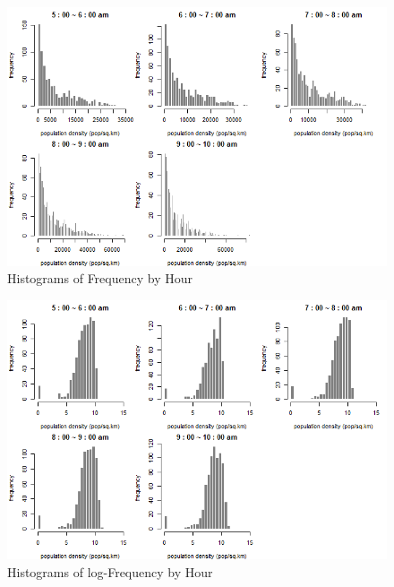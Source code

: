 \documentclass[hidelinks,12pt]{article}
\begin{document}
	\begin{figure}[!ht]
		\includegraphics[width=\textwidth]{hist.png}
		\caption{Histograms of Frequency by Hour \label{fig:hist}}
	\end{figure}
\FloatBarrier
	\begin{figure}[!ht]
		\includegraphics[width=\textwidth]{hist_log.png}
		\caption{Histograms of log-Frequency by Hour \label{fig:lghist}}
	\end{figure}
\end{document}
